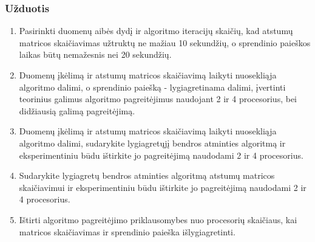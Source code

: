 \documentclass[a4paper,10pt]{article}
\begin{document}
\subsubsection{Užduotis}
\begin{enumerate}
	\item Pasirinkti duomenų aibės dydį ir algoritmo iteracijų skaičių, kad atstumų matricos skaičiavimas užtruktų ne mažiau 10 sekundžių, o sprendinio paieškos laikas būtų nemažesnis nei 20 sekundžių. \label{pirmas nurodymas}

	\item Duomenų įkėlimą ir atstumų matricos skaičiavimą laikyti nuosekliąja algoritmo dalimi, o sprendinio paiešką - lygiagretinama dalimi, įvertinti teorinius galimus algoritmo pagreitėjimus naudojant 2 ir 4 procesorius, bei didžiausią galimą pagreitėjimą. \label{antras nurodymas}

	\item Duomenų įkėlimą ir atstumų matricos skaičiavimą laikyti nuosekliąja algoritmo dalimi, sudarykite lygiagretųjį bendros atminties algoritmą ir eksperimentiniu būdu ištirkite jo pagreitėjimą naudodami 2 ir 4 procesorius. \label{trecias nurodymas}

	\item Sudarykite lygiagretų bendros atminties algoritmą atstumų matricos skaičiavimui ir eksperimentiniu būdu ištirkite jo pagreitėjimą naudodami 2 ir 4 procesorius. \label{ketvirtas nurodymas}

	\item  Ištirti algoritmo pagreitėjimo priklausomybes nuo procesorių skaičiaus, kai matricos skaičiavimas ir sprendinio paieška išlygiagretinti.\label{penktas nurodymas}

\end{enumerate}
\newpage
\end{document}
